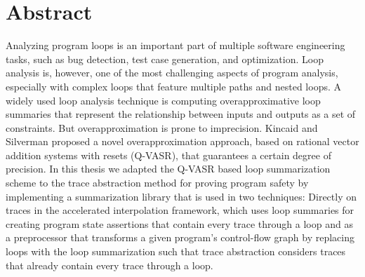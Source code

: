 \section*{Abstract}
Analyzing program loops is an important part of multiple software engineering tasks, such as bug detection, test case generation, and optimization. Loop analysis is, however, one of the most challenging aspects of program analysis, especially with complex loops that feature multiple paths and nested loops. A widely used loop analysis technique is computing overapproximative loop summaries that represent the relationship between inputs and outputs as a set of constraints. But overapproximation is prone to imprecision. Kincaid and Silverman proposed a novel overapproximation approach, based on rational vector addition systems with resets (Q-VASR), that guarantees a certain degree of precision. In this thesis we adapted the Q-VASR based loop summarization scheme to the trace abstraction method for proving program safety by implementing a summarization library that is used in two techniques: Directly on traces in the accelerated interpolation framework, which uses loop summaries for creating program state assertions that contain every trace through a loop and as a preprocessor that transforms a given program's control-flow graph by replacing loops with the loop summarization such that trace abstraction considers traces that already contain every trace through a loop.
\pagebreak